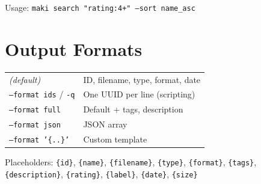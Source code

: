 \documentclass[a4paper,10pt]{extarticle}
\newcommand{\cmd}[1]{\texttt{#1}}
\begin{document}
\begin{minipage}[t]{0.47\textwidth}
\vspace{4pt}
Usage: \cmd{maki search "rating:4+" --sort name\_asc}

\vspace{18pt}
\section{Output Formats}

\renewcommand{\arraystretch}{1.35}
\begin{tabularx}{\textwidth}{@{}l X@{}}
\textit{(default)}       & ID, filename, type, format, date \\
\cmd{--format ids} / \cmd{-q} & One UUID per line (scripting) \\
\cmd{--format full}      & Default + tags, description \\
\cmd{--format json}      & JSON array \\
\cmd{--format '\{..\}'}  & Custom template \\
\end{tabularx}

\vspace{4pt}
{\small Placeholders: \cmd{\{id\}}, \cmd{\{name\}}, \cmd{\{filename\}}, \cmd{\{type\}}, \cmd{\{format\}}, \cmd{\{tags\}}, \cmd{\{description\}}, \cmd{\{rating\}}, \cmd{\{label\}}, \cmd{\{date\}}, \cmd{\{size\}}}

\end{minipage}%
\hfill
\end{document}

